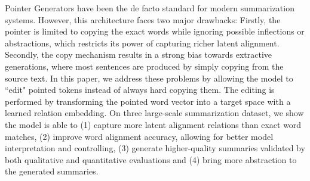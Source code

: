 Pointer Generators have been the de facto standard for modern summarization systems. However, this architecture faces two major drawbacks: Firstly, the pointer is limited to copying the exact words while ignoring possible inflections or abstractions, which restricts its power of capturing richer latent alignment. Secondly, the copy mechanism results in a strong bias towards extractive generations, where most sentences are produced by simply copying from the source text. In this paper, we address these problems by allowing the model to ``edit" pointed tokens instead of always hard copying them. The editing is performed by transforming the pointed word vector into a target space with a learned relation embedding. On three large-scale summarization dataset, we show the model is able to (1) capture more latent alignment relations than exact word matches, (2) improve word alignment accuracy, allowing for better model interpretation and controlling, (3) generate higher-quality summaries validated by both qualitative and quantitative evaluations and (4) bring more abstraction to the generated summaries.